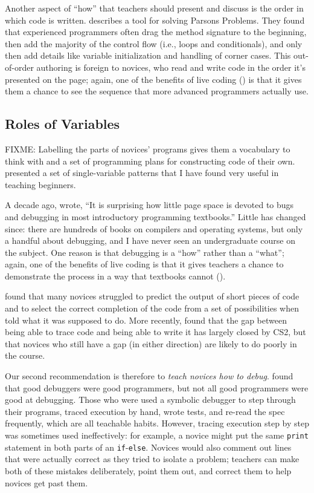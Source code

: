 Another aspect of ``how'' that teachers should present and discuss is the order in which code is written. \cite{Ihan2011} describes a tool for solving Parsons Problems. They found that experienced programmers often drag the method signature to the beginning, then add the majority of the control flow (i.e., loops and conditionals), and only then add details like variable initialization and handling of corner cases. This out-of-order authoring is foreign to novices, who read and write code in the order it's presented on the page; again, one of the benefits of live coding () is that it gives them a chance to see the sequence that more advanced programmers actually use.

\subsection*{Roles of Variables}

FIXME:
Labelling the parts of novices' programs gives them a vocabulary to think with
and a set of programming plans for constructing code of their own.
\cite{Kuit2004,Byck2005,Saja2006} presented a set of single-variable patterns
that I have found very useful in teaching beginners.


A decade ago, \cite{McCa2008} wrote, ``It is surprising how little page space is devoted to bugs and debugging in most introductory programming textbooks.'' Little has changed since: there are hundreds of books on compilers and operating systems, but only a handful about debugging, and I have never seen an undergraduate course on the subject. One reason is that debugging is a ``how'' rather than a ``what''; again, one of the benefits of live coding is that it gives teachers a chance to demonstrate the process in a way that textbooks cannot ().

\cite{List2004,List2009} found that many novices struggled to predict the output of short pieces of code and to select the correct completion of the code from a set of possibilities when told what it was supposed to do. More recently, \cite{Harr2018} found that the gap between being able to trace code and being able to write it has largely closed by CS2, but that novices who still have a gap (in either direction) are likely to do poorly in the course.

Our second recommendation is therefore to \emph{teach novices how to debug}. \cite{Fitz2008,Murp2008} found that good debuggers were good programmers, but not all good programmers were good at debugging. Those who were used a symbolic debugger to step through their programs, traced execution by hand, wrote tests, and re-read the spec frequently, which are all teachable habits. However, tracing execution step by step was sometimes used ineffectively: for example, a novice might put the same \texttt{print} statement in both parts of an \texttt{if}-\texttt{else}. Novices would also comment out lines that were actually correct as they tried to isolate a problem; teachers can make both of these mistakes deliberately, point them out, and correct them to help novices get past them.

